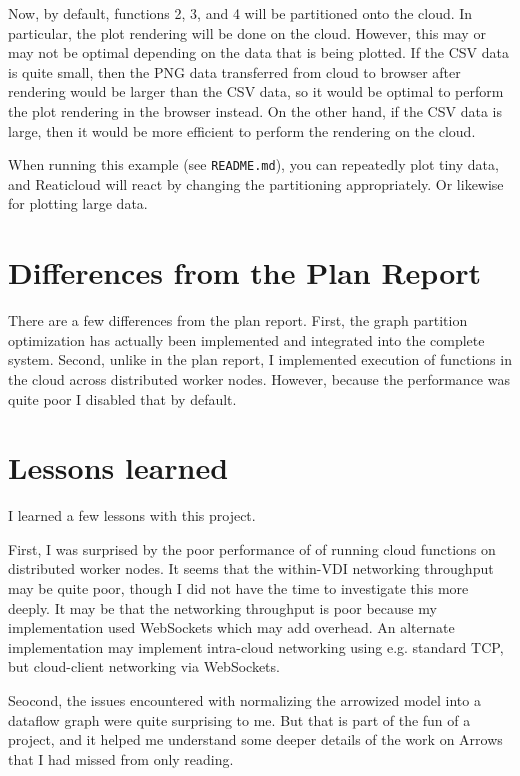 \documentclass[10pt,sigplan,screen,nonacm]{acmart}
\begin{document}
Now, by default, functions 2, 3, and 4 will be partitioned onto the cloud.
In particular, the plot rendering will be done on the cloud.
However, this may or may not be optimal depending on the data that is being plotted.
If the CSV data is quite small, then the PNG data transferred from cloud to browser
after rendering would be larger than the CSV data, so it would be optimal to
perform the plot rendering in the browser instead. On the other hand,
if the CSV data is large, then it would be more efficient to perform the
rendering on the cloud.

When running this example (see \texttt{README.md}), you can
repeatedly plot tiny data, and Reaticloud will react by changing the
partitioning appropriately. Or likewise for plotting large data. 


\section{Differences from the Plan Report}

There are a few differences from the plan report.
First, the graph partition optimization has actually been
implemented and integrated into the complete system.
Second, unlike in the plan report, I implemented execution
of functions in the cloud across distributed worker nodes.
However, because the performance was quite poor I disabled that
by default.


\section{Lessons learned}
I learned a few lessons with this project. 

First, I was surprised by the poor performance of 
of running cloud functions on distributed worker nodes.
It seems that the within-VDI networking throughput may be
quite poor, though I did not have the time to investigate this more deeply.
It may be that the networking throughput is poor because 
my implementation used WebSockets which may add overhead.
An alternate implementation may implement intra-cloud networking
using e.g. standard TCP, but cloud-client networking via WebSockets.

Seocond, the issues encountered with normalizing the arrowized model into
a dataflow graph were quite surprising to me. But that is part of the fun
of a project, and it helped me understand some deeper details of the
work on Arrows that I had missed from only reading.







\newpage

\appendix
\onecolumn
\end{document}
